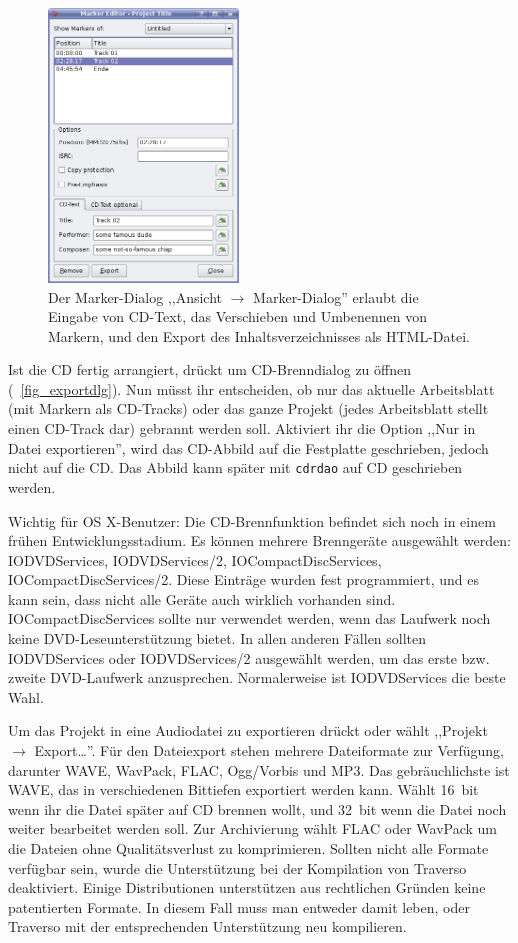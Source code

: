 \begin{figure}[ht]
 \centering\includegraphics[width=0.45\textwidth]{images/marker-editor}
 \caption{Der Marker-Dialog ,,Ansicht $\rightarrow$ Marker-Dialog'' erlaubt die Eingabe von CD-Text, das Verschieben und Umbenennen von Markern, und den Export des Inhaltsverzeichnisses als HTML-Datei.}
 \label{fig_marker-editor}
\end{figure}

Ist die CD fertig arrangiert, drückt  um CD-Brenndialog zu öffnen (\FigB~\ref{fig_exportdlg}). Nun müsst ihr entscheiden, ob nur das aktuelle Arbeitsblatt (mit Markern als CD-Tracks) oder das ganze Projekt (jedes Arbeitsblatt stellt einen CD-Track dar) gebrannt werden soll. Aktiviert ihr die Option ,,Nur in Datei exportieren'', wird das CD-Abbild auf die Festplatte geschrieben, jedoch nicht auf die CD. Das Abbild kann später mit \texttt{cdrdao} auf CD geschrieben werden.

Wichtig für OS X-Benutzer: Die CD-Brennfunktion befindet sich noch in einem frühen Entwicklungsstadium. Es können mehrere Brenngeräte ausgewählt werden: IODVDServices, IODVDServices/2, IOCompactDiscServices, IOCompactDiscServices/2. Diese Einträge wurden fest programmiert, und es kann sein, dass nicht alle Geräte auch wirklich vorhanden sind. IOCompactDiscServices sollte nur verwendet werden, wenn das Laufwerk noch keine DVD-Leseunterstützung bietet. In allen anderen Fällen sollten IODVDServices oder IODVDServices/2 ausgewählt werden, um das erste bzw. zweite DVD-Laufwerk anzusprechen. Normalerweise ist IODVDServices die beste Wahl.

Um das Projekt in eine Audiodatei zu exportieren drückt  oder wählt ,,Projekt $\rightarrow$ Export\dots''. Für den Dateiexport stehen mehrere Dateiformate zur Verfügung, darunter WAVE, WavPack, FLAC, Ogg/Vorbis und MP3. Das gebräuchlichste ist WAVE, das in verschiedenen Bittiefen exportiert werden kann. Wählt 16~bit wenn ihr die Datei später auf CD brennen wollt, und 32~bit wenn die Datei noch weiter bearbeitet werden soll. Zur Archivierung wählt FLAC oder WavPack um die Dateien ohne Qualitätsverlust zu komprimieren. Sollten nicht alle Formate verfügbar sein, wurde die Unterstützung bei der Kompilation von Traverso deaktiviert. Einige Distributionen unterstützen aus rechtlichen Gründen keine patentierten Formate. In diesem Fall muss man entweder damit leben, oder Traverso mit der entsprechenden Unterstützung neu kompilieren.

